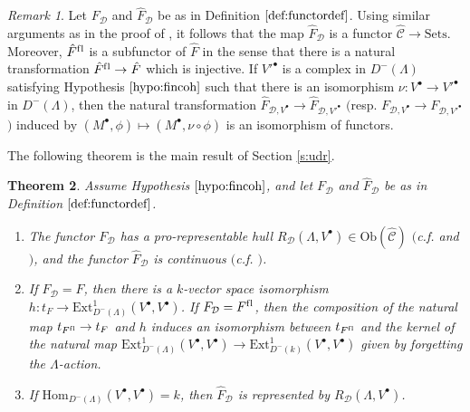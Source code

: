 \documentclass{amsart}
\theoremstyle{plain}
\newtheorem{thm}{Theorem}[subsection]
\theoremstyle{definition}
\theoremstyle{remark}
\newtheorem{rem}[thm]{Remark}
\begin{document}
\begin{rem}
\label{rem:functor}
Let ${F}_{\mathcal{D}}$ and
$\hat{F}_{\mathcal{D}}$ be as in Definition $\ref{def:functordef}$.
Using similar arguments as in the proof of \cite[Prop. 2.12]{bcderived}, it follows that
the map $\hat{F}_{\mathcal{D}}$ is a functor $\hat{\mathcal{C}}\to\mathrm{Sets}$.
Moreover, $\hat{F}^{\mathrm{f\/l}}$ is a subfunctor of $\hat{F}$ in the sense that there is
a natural transformation $\hat{F}^{\mathrm{f\/l}}\to\hat{F}$ which is injective.
If ${V'}^\bullet$ is a complex in $D^-(\Lambda)$ satisfying Hypothesis 
$\ref{hypo:fincoh}$ such
that there is an isomorphism $\nu:V^\bullet\to {V'}^\bullet$ in $D^-(\Lambda)$, 
then the natural transformation
$\hat{F}_{\mathcal{D},V^\bullet}\to \hat{F}_{\mathcal{D},{V'}^\bullet}$ $($resp.
${F}_{\mathcal{D},V^\bullet}\to {F}_{\mathcal{D},{V'}^\bullet}${}$)$ induced by
$(M^\bullet,\phi)\mapsto (M^\bullet,\nu\circ\phi)$ is an isomorphism of functors.
\end{rem}

The following theorem is the main result of Section \ref{s:udr}.

\begin{thm}
\label{thm:bigthm} Assume Hypothesis $\ref{hypo:fincoh}$, and let ${F}_{\mathcal{D}}$ and
$\hat{F}_{\mathcal{D}}$ be as in Definition $\ref{def:functordef}$.
\begin{enumerate}
\item[(i)] 
The functor
$F_{\mathcal{D}}$ has a pro-representable hull 
$R_{\mathcal{D}}(\Lambda,V^\bullet)\in \mathrm{Ob}(\hat{\mathcal{C}})$ 
$($c.f. \cite[Def. 2.7]{Sch} and \cite[\S 1.2]{Maz}$)$, and 
the functor $\hat{F}_{\mathcal{D}}$ is continuous
$($c.f. \cite{Maz}$)$. 

\item[(ii)]
If $F_{\mathcal{D}}=F$, then 
there is a $k$-vector space isomorphism $h: t_F \to
\mathrm{Ext}^1_{D^-(\Lambda)}(V^\bullet,V^\bullet)$.
If $F_{\mathcal{D}}=F^{\mathrm{f\/l}}$, then 
the composition of the natural map $t_{F^{\mathrm{f\/l}}}\to t_F$ and $h$ induces an isomorphism between
$t_{F^{\mathrm{f\/l}}}$ and
the kernel of the natural map $\mathrm{Ext}^1_{D^-(\Lambda)}(V^\bullet,V^\bullet)
\to \mathrm{Ext}^1_{D^-(k)}(V^\bullet,V^\bullet)$ given by forgetting the
$\Lambda$-action.

\item[(iii)]
If $\mathrm{Hom}_{D^-(\Lambda)}(V^\bullet,V^\bullet)= k$, then $\hat{F}_{\mathcal{D}}$ is represented
by $R_{\mathcal{D}}(\Lambda,V^\bullet)$. 
\end{enumerate}
\end{thm}
\end{document}
